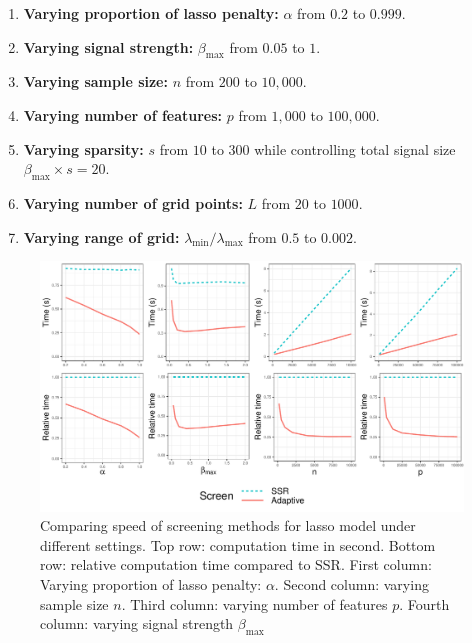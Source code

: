 \begin{enumerate}
    \item \textbf{Varying proportion of lasso penalty:} $\alpha$ from $0.2$ to $0.999$.
    \item \textbf{Varying signal strength:} $\beta_{\max}$ from $0.05$ to $1$.
    \item \textbf{Varying sample size:} $n$ from $200$ to $10,000$.
    \item \textbf{Varying number of features:} $p$ from $1,000$ to $100,000$.
    \item \textbf{Varying sparsity:} $s$ from $10$ to $300$ while controlling total signal size $\beta_{\max}\times s=20$.
    \item \textbf{Varying number of grid points:}  $L$ from $20$ to $1000$.
    \item \textbf{Varying range of grid:}  $\lambda_{\min}/\lambda_{\max}$ from $0.5$ to $0.002$.
\end{enumerate}

\begin{figure}[h]
    \centering
    \includegraphics[width=\textwidth]{enet1.pdf}    \caption{Comparing speed of screening methods for lasso model under different settings. Top row: computation time in second. Bottom row: relative computation time compared to SSR. First column: Varying proportion of lasso penalty: $\alpha$. Second column: varying sample size $n$. Third column: varying number of features $p$. Fourth column: varying signal strength $\beta_{\max}$}
    \label{fig:sim1}
\end{figure}

